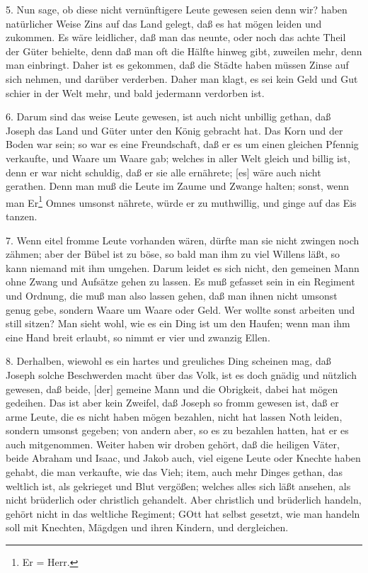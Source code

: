 5. Nun sage, ob diese nicht vernünftigere Leute gewesen seien denn wir? haben natürlicher Weise Zins auf das Land gelegt, daß es hat mögen leiden und zukommen. Es wäre leidlicher, daß man das neunte, oder noch das achte Theil der Güter behielte, denn daß man oft die Hälfte hinweg gibt, zuweilen mehr, denn man einbringt. Daher ist es gekommen, daß die Städte haben müssen Zinse auf sich nehmen, und darüber verderben. Daher man klagt, es sei kein Geld und Gut schier in der Welt mehr, und bald jedermann verdorben ist.

6. Darum sind das weise Leute gewesen, ist auch nicht unbillig gethan, daß Joseph das Land und Güter unter den König gebracht hat. Das Korn und der Boden war sein; so war es eine Freundschaft, daß er es um einen gleichen Pfennig verkaufte, und Waare um Waare gab; welches in aller Welt gleich und billig ist, denn er war nicht schuldig, daß er sie alle ernährete; [es] wäre auch nicht gerathen. Denn man muß die Leute im Zaume und Zwange halten; sonst, wenn man Er\footnote{Er = Herr.} Omnes umsonst nährete, würde er zu muthwillig, und ginge auf das Eis tanzen.

7. Wenn eitel fromme Leute vorhanden wären, dürfte man sie nicht zwingen noch zähmen; aber der Bübel ist zu böse, so bald man ihm zu viel Willens läßt, so kann niemand mit ihm umgehen. Darum leidet es sich nicht, den gemeinen Mann ohne Zwang und Aufsätze gehen zu lassen. Es muß gefasset sein in ein Regiment und Ordnung, die muß man also lassen gehen, daß man ihnen nicht umsonst genug gebe, sondern Waare um Waare oder Geld. Wer wollte sonst arbeiten und still sitzen? Man sieht wohl, wie es ein Ding ist um den Haufen; wenn man ihm eine Hand breit erlaubt, so nimmt er vier und zwanzig Ellen.

8. Derhalben, wiewohl es ein hartes und greuliches Ding scheinen mag, daß Joseph solche Beschwerden macht über das Volk, ist es doch gnädig und nützlich gewesen, daß beide, [der] gemeine Mann und die Obrigkeit, dabei hat mögen gedeihen. Das ist aber kein Zweifel, daß Joseph so fromm gewesen ist, daß er arme Leute, die es nicht haben mögen bezahlen, nicht hat lassen Noth leiden, sondern umsonst gegeben; von andern aber, so es zu bezahlen hatten, hat er es auch mitgenommen. Weiter haben wir droben gehört, daß die heiligen Väter, beide Abraham und Isaac, und Jakob auch, viel eigene Leute oder Knechte haben gehabt, die man verkaufte, wie das Vieh; item, auch mehr Dinges gethan, das weltlich ist, als gekrieget und Blut vergößen; welches alles sich läßt ansehen, als nicht brüderlich oder christlich gehandelt. Aber christlich und brüderlich handeln, gehört nicht in das weltliche Regiment; GOtt hat selbst gesetzt, wie man handeln soll mit Knechten, Mägdgen und ihren Kindern, und dergleichen.

